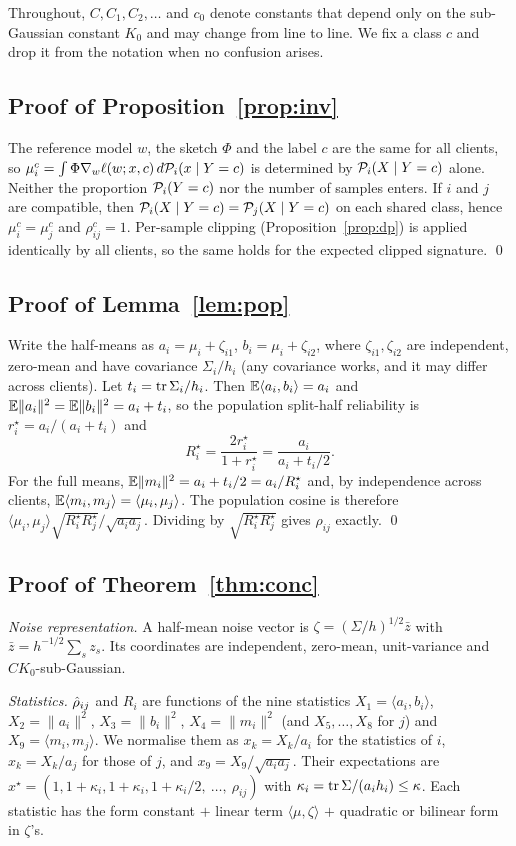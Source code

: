 Throughout, $C,C_1,C_2,\dots$ and $c_0$ denote constants that depend only on the sub-Gaussian constant $K_0$ and may change from line to line. We fix a class $c$ and drop it from the notation when no confusion arises.

\subsection{Proof of Proposition~\ref{prop:inv}}
The reference model $w$, the sketch $\Phi$ and the label $c$ are the same for all clients, so
$\mu_i^c=\int \Phi\nabla_w\ell(w;x,c)\,d\mathcal{P}_i(x\mid Y=c)$ is determined by $\mathcal{P}_i(X\mid Y=c)$ alone. Neither the proportion $\mathcal{P}_i(Y=c)$ nor the number of samples enters. If $i$ and $j$ are compatible, then $\mathcal{P}_i(X\mid Y=c)=\mathcal{P}_j(X\mid Y=c)$ on each shared class, hence $\mu_i^c=\mu_j^c$ and $\rho^c_{ij}=1$. Per-sample clipping (Proposition~\ref{prop:dp}) is applied identically by all clients, so the same holds for the expected clipped signature. \qed

\subsection{Proof of Lemma~\ref{lem:pop}}
Write the half-means as $a_i=\mu_i+\zeta_{i1}$, $b_i=\mu_i+\zeta_{i2}$, where $\zeta_{i1},\zeta_{i2}$ are independent, zero-mean and have covariance $\Sigma_i/h_i$ (any covariance works, and it may differ across clients). Let $t_i=\operatorname{tr}\Sigma_i/h_i$. Then
$\mathbb{E}\langle a_i,b_i\rangle=a_i$ and $\mathbb{E}\|a_i\|^2=\mathbb{E}\|b_i\|^2=a_i+t_i$, so the population split-half reliability is $r_i^\star=a_i/(a_i+t_i)$ and
\[R_i^\star=\frac{2r_i^\star}{1+r_i^\star}=\frac{a_i}{a_i+t_i/2}.\]
For the full means, $\mathbb{E}\|m_i\|^2=a_i+t_i/2=a_i/R_i^\star$ and, by independence across clients, $\mathbb{E}\langle m_i,m_j\rangle=\langle\mu_i,\mu_j\rangle$. The population cosine is therefore
$\langle\mu_i,\mu_j\rangle\sqrt{R^\star_iR^\star_j}/\sqrt{a_ia_j}$. Dividing by $\sqrt{R_i^\star R_j^\star}$ gives $\rho_{ij}$ exactly. \qed

\subsection{Proof of Theorem~\ref{thm:conc}}
\emph{Noise representation.} A half-mean noise vector is $\zeta=(\Sigma/h)^{1/2}\bar z$ with $\bar z=h^{-1/2}\sum_{s}z_s$. Its coordinates are independent, zero-mean, unit-variance and $CK_0$-sub-Gaussian.

\emph{Statistics.} $\hat\rho_{ij}$ and $R_i$ are functions of the nine statistics
$X_1=\langle a_i,b_i\rangle$, $X_2=\|a_i\|^2$, $X_3=\|b_i\|^2$, $X_4=\|m_i\|^2$ (and $X_5,\dots,X_8$ for $j$) and $X_9=\langle m_i,m_j\rangle$. We normalise them as $x_k=X_k/a_i$ for the statistics of $i$, $x_k=X_k/a_j$ for those of $j$, and $x_9=X_9/\sqrt{a_ia_j}$. Their expectations are $x^\star=(1,1+\kappa_i,1+\kappa_i,1+\kappa_i/2,\ \dots,\ \rho_{ij})$ with $\kappa_i=\operatorname{tr}\Sigma/(a_ih_i)\le\kappa$. Each statistic has the form
constant $+$ linear term $\langle\mu,\zeta\rangle$ $+$ quadratic or bilinear form in $\zeta$'s.

